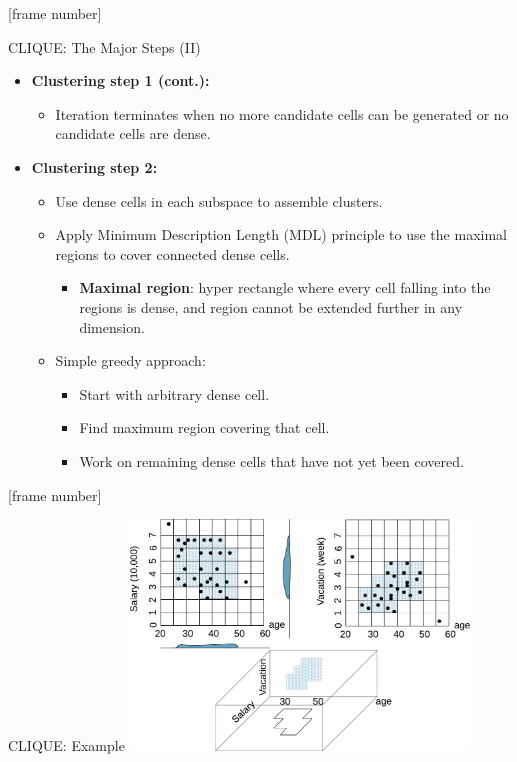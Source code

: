 \documentclass[aspectratio=169,t,xcolor=dvipsnames]{beamer}
\begin{document}
  {
    [frame number]
    \begin{frame}{CLIQUE: The Major Steps (II)}
      \begin{itemize}
        \item \textbf{Clustering step 1 (cont.):}
        \begin{itemize}
          \item Iteration terminates when no more candidate cells can be generated or no candidate cells are dense.
        \end{itemize}
        \item \textbf{Clustering step 2:}
        \begin{itemize}
          \item Use dense cells in each subspace to assemble clusters.
          \item Apply Minimum Description Length (MDL) principle to use the maximal regions to cover connected dense cells.
          \begin{itemize}
            \item \textbf{\color{airforceblue}Maximal region}: hyper rectangle where every cell falling into the regions is dense, and region cannot be extended further in any dimension.
          \end{itemize}
          \item Simple greedy approach:
          \begin{itemize}
            \item Start with arbitrary dense cell.
            \item Find maximum region covering that cell.
            \item Work on remaining dense cells that have not yet been covered.
          \end{itemize}
        \end{itemize}
      \end{itemize}
    \end{frame}
  }

  {
    [frame number]
    \begin{frame}{CLIQUE: Example}
      \centering
      \includegraphics[width=9cm]{img/clique.pdf}
    \end{frame}
  }
\end{document}
